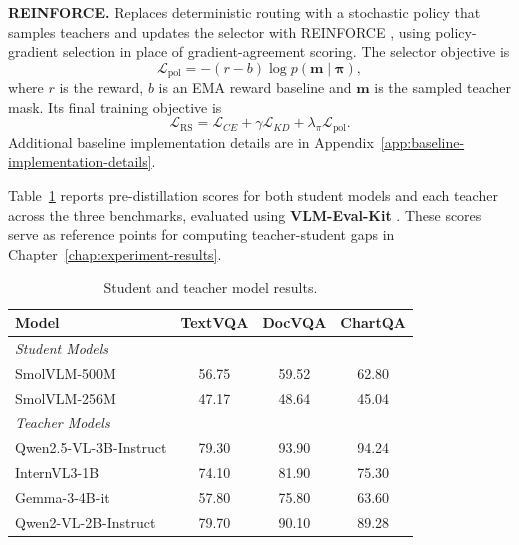 \textbf{REINFORCE.} Replaces deterministic routing with a stochastic policy
that samples teachers and updates the selector with REINFORCE
\cite{williams1992simple,yuan2020reinforcedmultiteacherselection}, using
policy-gradient selection in place of gradient-agreement scoring. The selector objective is
\begin{equation}
\mathcal{L}_{\mathrm{pol}}
=
-(r-b)\log p(\mathbf{m}\mid\boldsymbol{\pi}),
\end{equation}
where \(r\) is the reward, \(b\) is an EMA reward baseline and
\(\mathbf{m}\) is the sampled teacher mask. Its final training objective is
\begin{equation}
\mathcal{L}_{\mathrm{RS}}
=
\mathcal{L}_{CE}
+ \gamma \mathcal{L}_{KD}
+ \lambda_{\pi}\mathcal{L}_{\mathrm{pol}}.
\end{equation}
Additional baseline implementation details are in
Appendix~\ref{app:baseline-implementation-details}.

Table~\ref{tab:all-results} reports pre-distillation scores for both student
models and each teacher across the three benchmarks, evaluated using
\textbf{VLM-Eval-Kit} \cite{duan2024vlmevalkit}. These scores serve as
reference points for computing teacher-student gaps in
Chapter~\ref{chap:experiment-results}.

\begin{table}[H]
\centering
\caption[Student and teacher model results.]{Student and teacher model results.}
\label{tab:all-results}
\begin{tabular}{lccc}
\toprule
\textbf{Model} & \textbf{TextVQA} & \textbf{DocVQA} & \textbf{ChartQA} \\
\midrule
\multicolumn{4}{l}{\textit{Student Models}} \\
\midrule
SmolVLM-500M & 56.75 & 59.52 & 62.80 \\
SmolVLM-256M & 47.17 & 48.64 & 45.04 \\
\midrule
\multicolumn{4}{l}{\textit{Teacher Models}} \\
\midrule
Qwen2.5-VL-3B-Instruct & 79.30 & 93.90 & 94.24 \\
InternVL3-1B & 74.10 & 81.90 & 75.30 \\
Gemma-3-4B-it & 57.80 & 75.80 & 63.60 \\
Qwen2-VL-2B-Instruct & 79.70 & 90.10 & 89.28 \\
\bottomrule
\end{tabular}
\end{table}

